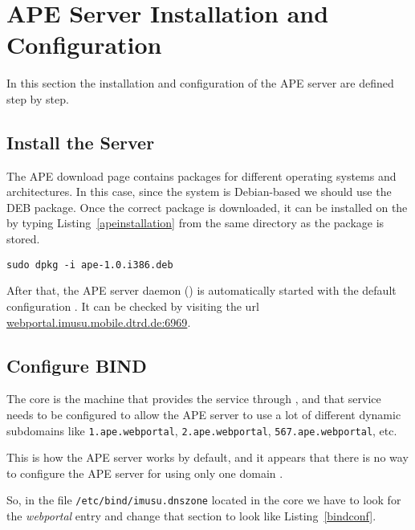 \section{APE Server Installation and Configuration} %
\label{sec:apeconfig}

In this section the installation and configuration of the \ac{APE} server are defined step by step.

\subsection{Install the Server} %
\label{sub:apeinstall}

The \ac{APE} download page \cite{ApeDownload} contains packages for different operating systems and architectures.
In this case, since the system is Debian-based we should use the DEB package.
Once the correct package is downloaded, it can be installed on the  by typing Listing~\vref{apeinstallation} from the same directory as the package is stored.

\begin{lstlisting}[label=apeinstallation,caption=APE installation command]
  sudo dpkg -i ape-1.0.i386.deb
\end{lstlisting}

After that, the \ac{APE} server daemon () is automatically started with the default configuration \cite{ApeSetup}.
It can be checked by visiting the url \url{webportal.imusu.mobile.dtrd.de:6969}.


\subsection{Configure BIND} %
\label{sub:bind}

The  core is the machine that provides the  service through , and that service needs to be configured to allow the \ac{APE} server to use a lot of different dynamic subdomains like \verb|1.ape.webportal|, \verb|2.ape.webportal|, \verb|567.ape.webportal|, etc.

This is how the \ac{APE} server works by default, and it appears that there is no way to configure the \ac{APE} server for using only one domain \cite{ApeConfig}.

So, in the file \verb|/etc/bind/imusu.dnszone| located in the  core
we have to look for the \emph{webportal} entry and change that section to look
like Listing~\vref{bindconf}.

